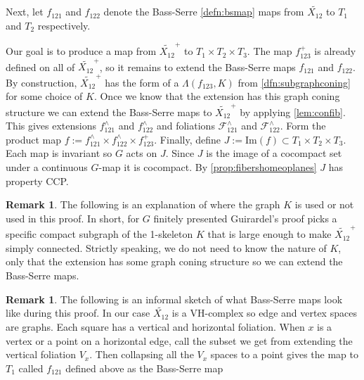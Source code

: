 \documentclass[12pt,parskip=full]{report}
\theoremstyle{plain}
\theoremstyle{definition}
\newtheorem{rmk}[thm]{Remark}
\begin{document}
        Next, let  \(f_{121}\) and  \(f_{122}\)  denote the Bass-Serre \ref{defn:bsmap} maps from \(\widetilde {X_{12}}\) to \(T_{1}\) and \(T_{2}\) respectively. 
        
        Our goal is to produce a map from \(\widetilde {X_{12}}^+\) to \(T_1\times T_2\times T_3\). The map \(f_{123}^+\) is already defined on all of \(\widetilde {X_{12}}^+\), so it remains to extend the Bass-Serre maps \(f_{121}\) and \(f_{122}\). By construction, \(\widetilde {X_{12}}^+\) has the form of a \(\Lambda(f_{123}, K)\) from \ref{dfn:subgraphconing} for some choice of \(K\). Once we know that the extension has this graph coning structure we can extend the Bass-Serre maps to \(\widetilde {X_{12}}^+\) by applying \ref{lem:confib}. This gives extensions \(f_{121}^{\wedge}\) and \(f_{122}^{\wedge}\) and foliations \(\mathscr{F}^{\wedge}_{121}\) and \(\mathscr{F}^{\wedge}_{122}\). Form the product map \(f:= f_{121}^{\wedge} \times f_{122}^{\wedge} \times f_{123}^{+}\). Finally, define \(J := \text{Im}(f) \subset T_1\times T_2\times T_3\). Each map is invariant so \(G\) acts on \(J\). Since \(J\) is the image of a cocompact set under a continuous \(G\)-map it is cocompact. By \ref{prop:fibershomeoplanes} \(J\) has property CCP.
        
        \begin{rmk}
            The following is an explanation of where the graph \(K\) is used or not used in this proof. In short, for \(G\) finitely presented Guirardel's proof picks a specific compact subgraph of the 1-skeleton \(K\) that is large enough to make \(\widetilde {X_{12}}^+\) simply connected. Strictly speaking, we do not need to know the nature of \(K\), only that the extension has some graph coning structure so we can extend the Bass-Serre maps.
        \end{rmk}
        
        \begin{rmk}
            
        The following is an informal sketch of what Bass-Serre maps look like during this proof. In our case \(\widetilde {X_{12}}\) is a VH-complex so edge and vertex spaces are graphs. Each square has a vertical and horizontal foliation. When $x$ is a vertex or a point on a horizontal edge, call the subset we get from extending the vertical foliation $V_x$. Then collapsing all the $V_x$ spaces to a point gives the map to $T_1$ called \(f_{121}\) defined above as the Bass-Serre map
        \end{rmk}
    
\end{document}
